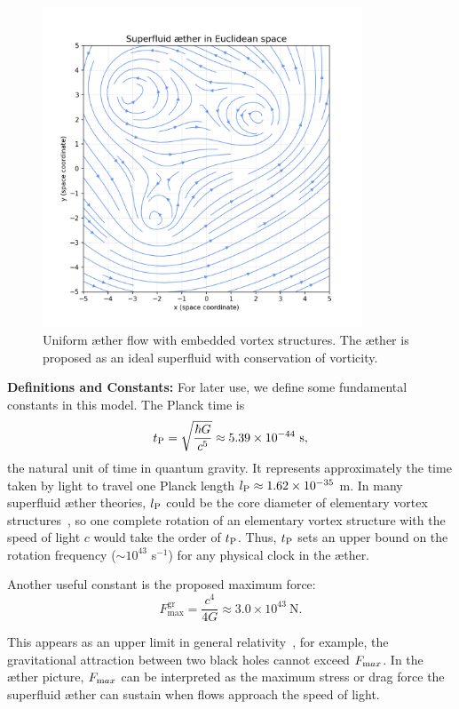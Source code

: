 \begin{figure}[htbp]
    \centering
    \includegraphics[width=0.85\textwidth]{04-ÆtherSuperfluïde}
    \caption{Uniform æther flow with embedded vortex structures. The æther is proposed as an ideal superfluid with conservation of vorticity.}
    \label{fig:ÆtherSuperfluïde}
\end{figure}


\textbf{Definitions and Constants:} For later use, we define some fundamental constants in this model. The Planck time is
\[
    t_{\textrm P} = \sqrt{\frac{\hbar G}{c^5}} \approx 5.39\times10^{-44}\ \text{s},
\]
the natural unit of time in quantum gravity. It represents approximately the time taken by light to travel one Planck length $l_{\textrm P} \approx 1.62\times10^{-35}$ m. In many superfluid æther theories, $l_{\textrm P}$ could be the core diameter of elementary vortex structures~\cite{Winterberg2002-PlanckÆther}, so one complete rotation of an elementary vortex structure with the speed of light $c$ would take the order of $t_{\textrm P}$. Thus, $t_{\textrm P}$ sets an upper bound on the rotation frequency ($\sim 10^{43}$ s$^{-1}$) for any physical clock in the æther.

Another useful constant is the proposed maximum force:
\begin{equation*}
    F^{\text{gr}}_{\text{max}} = \frac{c^4}{4G} \approx 3.0\times10^{43}\ \text{N}.
\end{equation*}

This appears as an upper limit in general relativity~\cite{Schiller2022-maxforce}, for example, the gravitational attraction between two black holes cannot exceed $F_{\textrm max}$. In the æther picture, $F_{\textrm max}$ can be interpreted as the maximum stress or drag force the superfluid æther can sustain when flows approach the speed of light.


